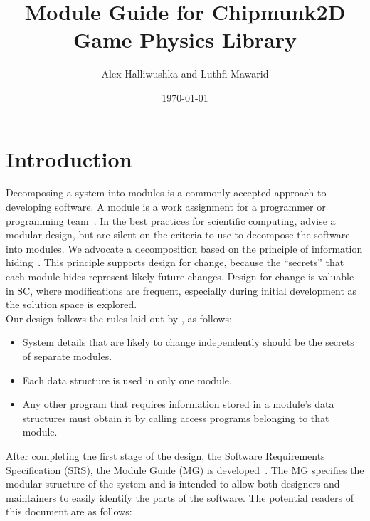 \documentclass[12pt]{article}
\begin{document}
\title{Module Guide for Chipmunk2D Game Physics Library} 
\author{Alex Halliwushka and Luthfi Mawarid}
\date{\today}
	
\maketitle

\tableofcontents

\section{Introduction}

Decomposing a system into modules is a commonly accepted approach to developing software.  A module is a work assignment for a programmer or programming team~\citep{ParnasEtAl1984}.  In the best practices for scientific computing, \citet{WilsonEtAl2013} advise a modular design, but are silent on the criteria to use to decompose the software into modules.  We advocate a decomposition based on the principle of information hiding~\citep{Parnas1972a}. This principle supports design for change, because the ``secrets'' that each module hides represent likely future changes.  Design for change is valuable in SC, where modifications are frequent, especially during initial development as the solution space is explored.  \\
\newline
Our design follows the rules laid out by \citet{ParnasEtAl1984}, as follows:
\begin{itemize}
\item System details that are likely to change independently should be the
  secrets of separate modules.
\item Each data structure is used in only one module.
\item Any other program that requires information stored in a module's data
  structures must obtain it by calling access programs belonging to that module.
\end{itemize}

\noindent After completing the first stage of the design, the Software Requirements
Specification (SRS), the Module Guide (MG) is developed~\citep{ParnasEtAl1984}. The MG
specifies the modular structure of the system and is intended to allow both
designers and maintainers to easily identify the parts of the software.  The
potential readers of this document are as follows:
\end{document}
